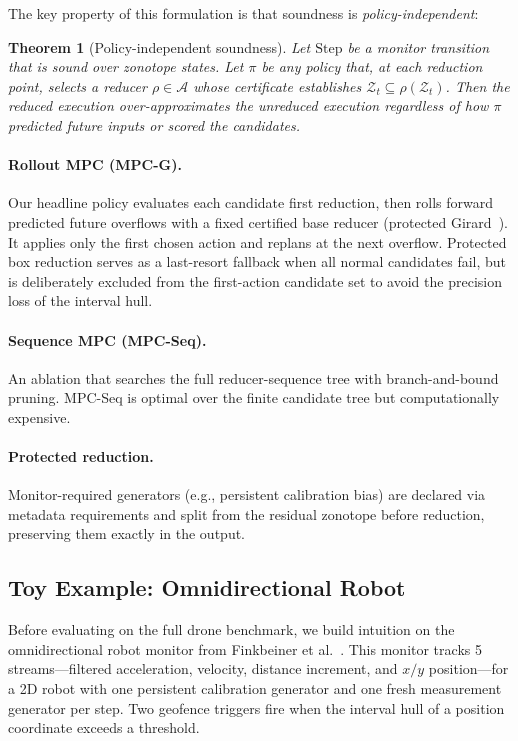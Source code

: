 \documentclass{article}
\newtheorem{theorem}{Theorem}
\newcommand{\Z}{\mathcal{Z}}
\begin{document}
The key property of this formulation is that soundness is \emph{policy-independent}:

\begin{theorem}[Policy-independent soundness]\label{thm:soundness}
Let $\mathrm{Step}$ be a monitor transition that is sound over zonotope states.
Let $\pi$ be any policy that, at each reduction point, selects a reducer $\rho \in \mathcal{A}$ whose certificate establishes $\Z_t \subseteq \rho(\Z_t)$.
Then the reduced execution over-approximates the unreduced execution regardless of how $\pi$ predicted future inputs or scored the candidates.
\end{theorem}

\paragraph{Rollout MPC (MPC-G).}
Our headline policy evaluates each candidate first reduction, then rolls forward predicted future overflows with a fixed certified base reducer (protected Girard~\cite{Girard2005}).
It applies only the first chosen action and replans at the next overflow.
Protected box reduction serves as a last-resort fallback when all normal candidates fail, but is deliberately excluded from the first-action candidate set to avoid the precision loss of the interval hull.

\paragraph{Sequence MPC (MPC-Seq).}
An ablation that searches the full reducer-sequence tree with branch-and-bound pruning.
MPC-Seq is optimal over the finite candidate tree but computationally expensive.

\paragraph{Protected reduction.}
Monitor-required generators (e.g., persistent calibration bias) are declared via metadata requirements and split from the residual zonotope before reduction, preserving them exactly in the output.


\subsection{Toy Example: Omnidirectional Robot}\label{sec:toy}

Before evaluating on the full drone benchmark, we build intuition on the omnidirectional robot monitor from Finkbeiner et al.~\cite{Finkbeiner2025}.
This monitor tracks 5 streams---filtered acceleration, velocity, distance increment, and $x/y$ position---for a 2D robot with one persistent calibration generator and one fresh measurement generator per step.
Two geofence triggers fire when the interval hull of a position coordinate exceeds a threshold.
\end{document}
